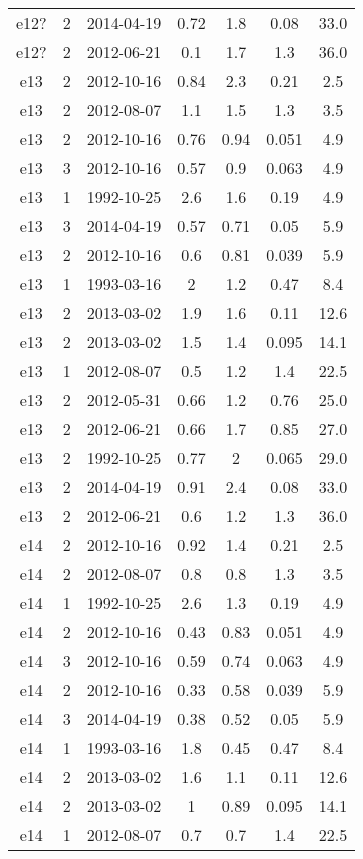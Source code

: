 \begin{table*}[htp]
\begin{tabular}{ccccccc}
e12? & 2 & 2014-04-19 & 0.72 & 1.8 & 0.08 & 33.0 \\
e12? & 2 & 2012-06-21 & 0.1 & 1.7 & 1.3 & 36.0 \\
e13 & 2 & 2012-10-16 & 0.84 & 2.3 & 0.21 & 2.5 \\
e13 & 2 & 2012-08-07 & 1.1 & 1.5 & 1.3 & 3.5 \\
e13 & 2 & 2012-10-16 & 0.76 & 0.94 & 0.051 & 4.9 \\
e13 & 3 & 2012-10-16 & 0.57 & 0.9 & 0.063 & 4.9 \\
e13 & 1 & 1992-10-25 & 2.6 & 1.6 & 0.19 & 4.9 \\
e13 & 3 & 2014-04-19 & 0.57 & 0.71 & 0.05 & 5.9 \\
e13 & 2 & 2012-10-16 & 0.6 & 0.81 & 0.039 & 5.9 \\
e13 & 1 & 1993-03-16 & 2 & 1.2 & 0.47 & 8.4 \\
e13 & 2 & 2013-03-02 & 1.9 & 1.6 & 0.11 & 12.6 \\
e13 & 2 & 2013-03-02 & 1.5 & 1.4 & 0.095 & 14.1 \\
e13 & 1 & 2012-08-07 & 0.5 & 1.2 & 1.4 & 22.5 \\
e13 & 2 & 2012-05-31 & 0.66 & 1.2 & 0.76 & 25.0 \\
e13 & 2 & 2012-06-21 & 0.66 & 1.7 & 0.85 & 27.0 \\
e13 & 2 & 1992-10-25 & 0.77 & 2 & 0.065 & 29.0 \\
e13 & 2 & 2014-04-19 & 0.91 & 2.4 & 0.08 & 33.0 \\
e13 & 2 & 2012-06-21 & 0.6 & 1.2 & 1.3 & 36.0 \\
e14 & 2 & 2012-10-16 & 0.92 & 1.4 & 0.21 & 2.5 \\
e14 & 2 & 2012-08-07 & 0.8 & 0.8 & 1.3 & 3.5 \\
e14 & 1 & 1992-10-25 & 2.6 & 1.3 & 0.19 & 4.9 \\
e14 & 2 & 2012-10-16 & 0.43 & 0.83 & 0.051 & 4.9 \\
e14 & 3 & 2012-10-16 & 0.59 & 0.74 & 0.063 & 4.9 \\
e14 & 2 & 2012-10-16 & 0.33 & 0.58 & 0.039 & 5.9 \\
e14 & 3 & 2014-04-19 & 0.38 & 0.52 & 0.05 & 5.9 \\
e14 & 1 & 1993-03-16 & 1.8 & 0.45 & 0.47 & 8.4 \\
e14 & 2 & 2013-03-02 & 1.6 & 1.1 & 0.11 & 12.6 \\
e14 & 2 & 2013-03-02 & 1 & 0.89 & 0.095 & 14.1 \\
e14 & 1 & 2012-08-07 & 0.7 & 0.7 & 1.4 & 22.5 \\

\end{tabular}
\end{table*}
